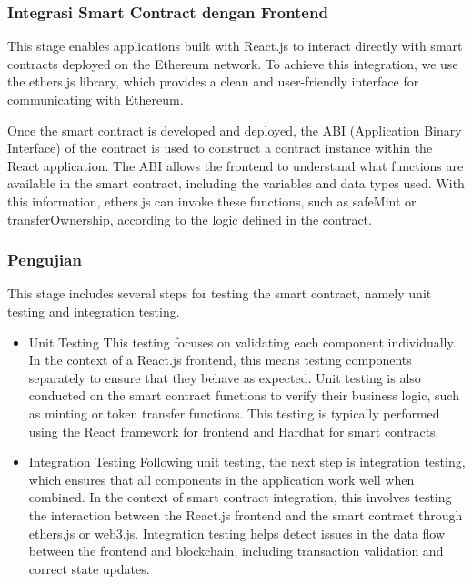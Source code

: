 \subsubsection{Integrasi Smart Contract dengan Frontend}
This stage enables applications built with React.js to interact directly with smart contracts deployed on the Ethereum network. To achieve this integration, we use the ethers.js library, which provides a clean and user-friendly interface for communicating with Ethereum.

Once the smart contract is developed and deployed, the ABI (Application Binary Interface) of the contract is used to construct a contract instance within the React application. The ABI allows the frontend to understand what functions are available in the smart contract, including the variables and data types used. With this information, ethers.js can invoke these functions, such as safeMint or transferOwnership, according to the logic defined in the contract.

\subsubsection{Pengujian}
This stage includes several steps for testing the smart contract, namely unit testing and integration testing.

\begin{itemize}
    \item Unit Testing
    This testing focuses on validating each component individually. In the context of a React.js frontend, this means testing components separately to ensure that they behave as expected. Unit testing is also conducted on the smart contract functions to verify their business logic, such as minting or token transfer functions. This testing is typically performed using the React framework for frontend and Hardhat for smart contracts.

    \item Integration Testing
    Following unit testing, the next step is integration testing, which ensures that all components in the application work well when combined. In the context of smart contract integration, this involves testing the interaction between the React.js frontend and the smart contract through ethers.js or web3.js. Integration testing helps detect issues in the data flow between the frontend and blockchain, including transaction validation and correct state updates.
    
\end{itemize}